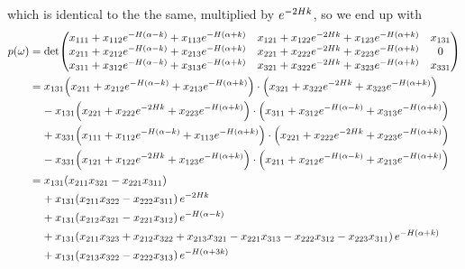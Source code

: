 \documentclass[reqno]{amsart}
\numberwithin{equation}{section}
\numberwithin{figure}{section}
\begin{document}
which is identical to the the same, multiplied by $e^{-2H k}$, so we end up with
\begin{align*}
p\!\left(\omega\right)
  &= \det\!\begin{pmatrix}
x_{111}+x_{112}e^{-\aHeight\left(\alpha-k\right)}+x_{113}e^{-\aHeight\left(\alpha+k\right)} & x_{121}+x_{122}e^{-2\aHeight k}+x_{123}e^{-\aHeight\left(\alpha+k\right)} & x_{131}\\
x_{211}+x_{212}e^{-\aHeight\left(\alpha-k\right)}+x_{213}e^{-\aHeight\left(\alpha+k\right)} & x_{221}+x_{222}e^{-2\aHeight k}+x_{223}e^{-\aHeight\left(\alpha+k\right)} & 0\\
x_{311}+x_{312}e^{-\aHeight\left(\alpha-k\right)}+x_{313}e^{-\aHeight\left(\alpha+k\right)} & x_{321}+x_{322}e^{-2\aHeight k}+x_{323}e^{-\aHeight\left(\alpha+k\right)} & x_{331}
\end{pmatrix} \\
  &= x_{131}\!\left(x_{211}+x_{212}e^{-\aHeight\left(\alpha-k\right)}+x_{213}e^{-\aHeight\left(\alpha+k\right)}\right)\cdot\left(x_{321}+x_{322}e^{-2\aHeight k}+x_{323}e^{-\aHeight\left(\alpha+k\right)}\right) \\
  &\phantom{=}\,\,-x_{131}\!\left(x_{221}+x_{222}e^{-2\aHeight k}+x_{223}e^{-\aHeight\left(\alpha+k\right)}\right)\cdot\left(x_{311}+x_{312}e^{-\aHeight\left(\alpha-k\right)}+x_{313}e^{-\aHeight\left(\alpha+k\right)}\right) \\
  &\phantom{=}\,\,+x_{331}\!\left(x_{111}+x_{112}e^{-\aHeight\left(\alpha-k\right)}+x_{113}e^{-\aHeight\left(\alpha+k\right)}\right)\cdot\left(x_{221}+x_{222}e^{-2\aHeight k}+x_{223}e^{-\aHeight\left(\alpha+k\right)}\right) \\
  &\phantom{=}\,\,-x_{331}\!\left(x_{121}+x_{122}e^{-2\aHeight k}+x_{123}e^{-\aHeight\left(\alpha+k\right)}\right)\cdot\left(x_{211}+x_{212}e^{-\aHeight\left(\alpha-k\right)}+x_{213}e^{-\aHeight\left(\alpha+k\right)}\right) \\
  &= x_{131}\!\left(x_{211}x_{321}-x_{221}x_{311}\right) \\
  &\phantom{=}\,\,+x_{131}\!\left(x_{211}x_{322}-x_{222}x_{311}\right)e^{-2\aHeight k} \\
  &\phantom{=}\,\,+x_{131}\!\left(x_{212}x_{321}-x_{221}x_{312}\right)e^{-\aHeight\left(\alpha-k\right)} \\
  &\phantom{=}\,\,+x_{131}\!\left(x_{211}x_{323}+x_{212}x_{322}+x_{213}x_{321}-x_{221}x_{313}-x_{222}x_{312}-x_{223}x_{311}\right)e^{-\aHeight\left(\alpha+k\right)} \\
  &\phantom{=}\,\,+x_{131}\!\left(x_{213}x_{322}-x_{222}x_{313}\right)e^{-\aHeight\left(\alpha+3k\right)} \\

\end{align*}
\end{document}
